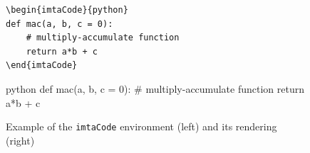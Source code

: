 \documentclass{report}
\begin{document}
\begin{figure}[!ht]
\begin{minipage}{.45\linewidth}
\renewcommand{\theFancyVerbLine}{\texttt{\textcolor{gray!150}{\normalsize \oldstylenums{\arabic{FancyVerbLine}}}}}%
\vspace{0.5\baselineskip}%
\begin{mdframed}[backgroundcolor=imtaCodeLinenosFrame, innerrightmargin=0pt, innertopmargin=0pt, innerbottommargin=0pt, linewidth=1pt]
\begin{mdframed}[backgroundcolor=imtaCodeBackground, skipabove=0pt, skipbelow=0pt, rightmargin=0pt, leftmargin=3ex, linewidth=0pt, innertopmargin=5pt, innerbottommargin=5pt, innerleftmargin=1ex]%
\begin{verbatim}
\begin{imtaCode}{python}
def mac(a, b, c = 0):
    # multiply-accumulate function
    return a*b + c
\end{imtaCode}
\end{verbatim}
\end{mdframed}
\end{mdframed}
\end{minipage}
\hfill
\begin{minipage}{.45\linewidth}
\vspace{2em}
\begin{imtaCode}{python}
def mac(a, b, c = 0):
    # multiply-accumulate function
    return a*b + c
\end{imtaCode}
\end{minipage}
\caption{Example of the \texttt{imtaCode} environment (left) and its rendering (right)\label{fig:imtaCode}}
\end{figure}
\end{document}
